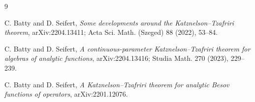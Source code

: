 \documentclass[11pt]{article}
\begin{document}
\begin{thebibliography}{9}

C. Batty and D. Seifert,
\emph{Some developments around the Katznelson--Tzafriri theorem},
arXiv:2204.13411; Acta Sci. Math. (Szeged) 88 (2022), 53--84.

C. Batty and D. Seifert,
\emph{A continuous-parameter Katznelson--Tzafriri theorem for algebras of
analytic functions},
arXiv:2204.13416; Studia Math. 270 (2023), 229--239.

C. Batty and D. Seifert,
\emph{A Katznelson--Tzafriri theorem for analytic Besov functions of
operators},
arXiv:2201.12076.

\end{thebibliography}
\end{document}
